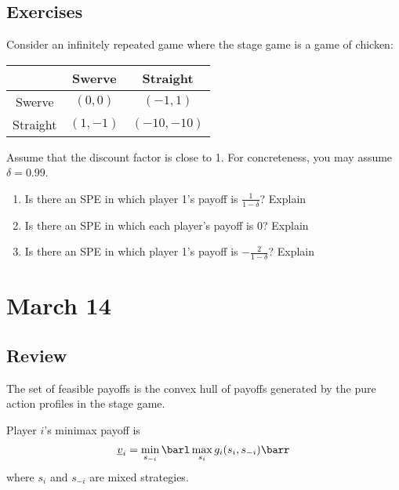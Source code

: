 \documentclass[10pt]{article}
\begin{document}
\subsection{Exercises}

Consider an infinitely repeated game where the stage game is a game of chicken:
\begin{center}
	\begin{tabular}{c|cc}
		& Swerve & Straight \\\hline 
		Swerve & $(0,0)$ & $(-1,1)$ \\
		Straight & $(1,-1)$ & $(-10,-10)$
	\end{tabular}
\end{center}
Assume that the discount factor is close to 1. For concreteness, you may assume $\delta = 0.99$.

\begin{enumerate}
	\item Is there an SPE in which player 1's payoff is $\frac{1}{1-\delta}$? Explain
	\item Is there an SPE in which each player's payoff is $0$? Explain
	\item Is there an SPE in which player 1's payoff is $-\frac{2}{1-\delta}$? Explain
\end{enumerate}

\section{March 14}

\subsection{Review} 

\begin{definition}
	The set of feasible payoffs is the convex hull of payoffs generated by the pure action profiles in the stage game.
\end{definition}
\begin{definition}
	Player $i$'s minimax payoff is \[\underline{v}_i = \min_{s_{-i}} \barl \max_{s_i} g_i(s_i,s_{-i})\barr\]where $s_i$ and $s_{-i}$ are mixed strategies.
\end{definition}
\end{document}
